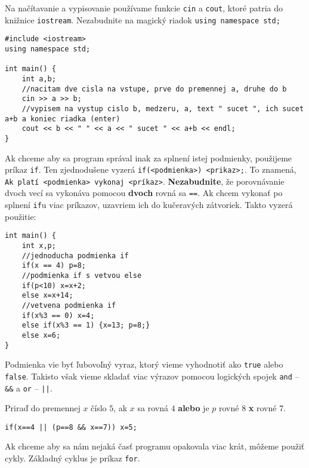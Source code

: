 
Na načítavanie a vypisovanie používame funkcie \texttt{cin} a \texttt{cout}, ktoré patria do
knižnice \texttt{iostream}. Nezabudnite na magický riadok \texttt{using namespace std;}

\begin{lstlisting}
#include <iostream>
using namespace std;

int main() {
    int a,b;
    //nacitam dve cisla na vstupe, prve do premennej a, druhe do b
    cin >> a >> b;
    //vypisem na vystup cislo b, medzeru, a, text " sucet ", ich sucet a+b a koniec riadka (enter)
    cout << b << " " << a << " sucet " << a+b << endl;
}
\end{lstlisting}


Ak chceme aby sa program správal inak za splnení istej podmienky, použijeme príkaz \texttt{if}. Ten
zjednodušene vyzerá \texttt{if(<podmienka>) <prikaz>;}. To znamená, \texttt{Ak platí <podmienka>
vykonaj <príkaz>}. \textbf{Nezabudnite}, že porovnávanie dvoch vecí sa vykonáva pomocou \textbf{dvoch}
rovná sa \texttt{==}. Ak chcem vykonať po splnení \texttt{if}u viac príkazov, uzavriem ich do
kučeravých zátvoriek. Takto vyzerá použitie:

\begin{lstlisting}
int main() {
    int x,p;
    //jednoducha podmienka if
    if(x == 4) p=8;
    //podmienka if s vetvou else
    if(p<10) x=x+2;
    else x=x+14;
    //vetvena podmienka if
    if(x%3 == 0) x=4;
    else if(x%3 == 1) {x=13; p=8;}
    else x=6;
}
\end{lstlisting}

Podmienka vie byť ľubovoľný vyraz, ktorý vieme vyhodnotiť ako \texttt{true} alebo \texttt{false}.
Takisto však vieme skladať viac výrazov pomocou logických spojek \texttt{and} -- \texttt{\&\&} a
\texttt{or} -- \texttt{||}.

Priraď do premennej $x$ číslo $5$, ak $x$ sa rovná $4$ \textbf{alebo} je $p$ rovné $8$ \textbf{x}
rovné $7$.
\begin{lstlisting}
if(x==4 || (p==8 && x==7)) x=5;
\end{lstlisting}

\newpage


Ak chceme aby sa nám nejaká časť programu opakovala viac krát, môžeme použiť cykly. Základný cyklus
je príkaz \texttt{for}.

